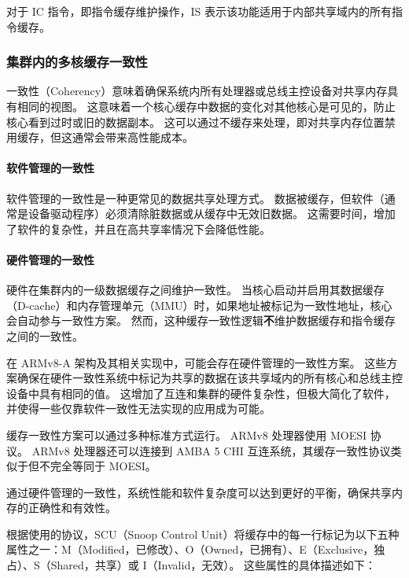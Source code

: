 对于 IC 指令，即指令缓存维护操作，IS 表示该功能适用于内部共享域内的所有指令缓存。

\subsubsection{集群内的多核缓存一致性}

一致性（Coherency）意味着确保系统内所有处理器或总线主控设备对共享内存具有相同的视图。
这意味着一个核心缓存中数据的变化对其他核心是可见的，防止核心看到过时或旧的数据副本。
这可以通过不缓存来处理，即对共享内存位置禁用缓存，但这通常会带来高性能成本。

\paragraph*{软件管理的一致性}

软件管理的一致性是一种更常见的数据共享处理方式。
数据被缓存，但软件（通常是设备驱动程序）必须清除脏数据或从缓存中无效旧数据。
这需要时间，增加了软件的复杂性，并且在高共享率情况下会降低性能。

\paragraph*{硬件管理的一致性}

硬件在集群内的一级数据缓存之间维护一致性。
当核心启动并启用其数据缓存（D-cache）和内存管理单元（MMU）时，如果地址被标记为一致性地址，核心会自动参与一致性方案。
然而，这种缓存一致性逻辑\textbf{不}维护数据缓存和指令缓存之间的一致性。

在 ARMv8-A 架构及其相关实现中，可能会存在硬件管理的一致性方案。
这些方案确保在硬件一致性系统中标记为共享的数据在该共享域内的所有核心和总线主控设备中具有相同的值。
这增加了互连和集群的硬件复杂性，但极大简化了软件，并使得一些仅靠软件一致性无法实现的应用成为可能。

缓存一致性方案可以通过多种标准方式运行。
ARMv8 处理器使用 MOESI 协议。
ARMv8 处理器还可以连接到 AMBA 5 CHI 互连系统，其缓存一致性协议类似于但不完全等同于 MOESI。

通过硬件管理的一致性，系统性能和软件复杂度可以达到更好的平衡，确保共享内存的正确性和有效性。

根据使用的协议，SCU（Snoop Control
Unit）将缓存中的每一行标记为以下五种属性之一：M（Modified，已修改）、O（Owned，已拥有）、E（Exclusive，独占）、S（Shared，共享）或 I（Invalid，无效）。
这些属性的具体描述如下：

